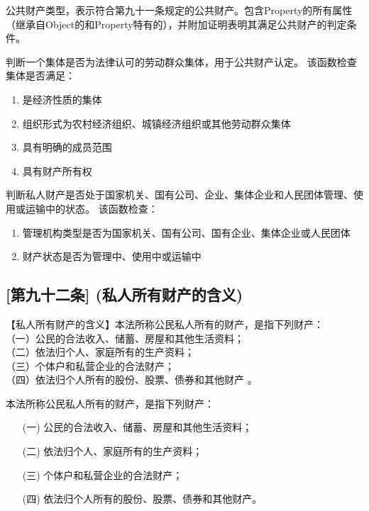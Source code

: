\begin{definition}\label{PublicProperty}
\leanok
{}
公共财产类型，表示符合第九十一条规定的公共财产。包含Property的所有属性（继承自Object的和Property特有的），并附加证明表明其满足公共财产的判定条件。
\end{definition}

\begin{definition}\label{isLegalCollective}
\leanok
{}
判断一个集体是否为法律认可的劳动群众集体，用于公共财产认定。
该函数检查集体是否满足：
\begin{enumerate}
\item 是经济性质的集体
\item 组织形式为农村经济组织、城镇经济组织或其他劳动群众集体
\item 具有明确的成员范围
\item 具有财产所有权
\end{enumerate}
\end{definition}

\begin{definition}\label{isInSpecialState}
\leanok
{}
判断私人财产是否处于国家机关、国有公司、企业、集体企业和人民团体管理、使用或运输中的状态。
该函数检查：
\begin{enumerate}
\item 管理机构类型是否为国家机关、国有公司、国有企业、集体企业或人民团体
\item 财产状态是否为管理中、使用中或运输中
\end{enumerate}
\end{definition}

\subsection{[第九十二条] (私人所有财产的含义)}

【私人所有财产的含义】本法所称公民私人所有的财产，是指下列财产：\\
（一）公民的合法收入、储蓄、房屋和其他生活资料；\\
（二）依法归个人、家庭所有的生产资料；\\
（三）个体户和私营企业的合法财产；\\
（四）依法归个人所有的股份、股票、债券和其他财产 。

\begin{definition}\label{isPrivateProperty}
\leanok
{}
本法所称公民私人所有的财产，是指下列财产：
\begin{enumerate}
\item[(一)] 公民的合法收入、储蓄、房屋和其他生活资料；
\item[(二)] 依法归个人、家庭所有的生产资料；
\item[(三)] 个体户和私营企业的合法财产；
\item[(四)] 依法归个人所有的股份、股票、债券和其他财产。
\end{enumerate}
\end{definition}

